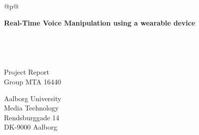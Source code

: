 %
\begin{titlepage}
  \addtolength{\hoffset}{0.5\evensidemargin-0.5\oddsidemargin} %
  \noindent%
  \begin{tabular}{@{}p{\textwidth}@{}}
    \toprule[2pt]
    \midrule
    \vspace{0.2cm}
    \begin{center}
    \Huge{\textbf{
      Real-Time Voice Manipulation using a wearable device%
    }}
    \end{center}
    \vspace{0.2cm}\\
    \midrule
    \toprule[2pt]
  \end{tabular}
  \vspace{1 cm}

  \begin{center}  
  \begin{minipage}{\linewidth}%
	\end{minipage}\\
	\vspace{1 cm}
  

    {\large
      Project Report%
    }\\
    \vspace{0.2cm}
    {\Large
      Group MTA 16440%
    }
  \end{center}
  \begin{center}
  Aalborg University\\
  Media Technology\\
  Rendsburggade 14\\
  DK-9000 Aalborg
  \end{center}
\end{titlepage}
\clearpage
